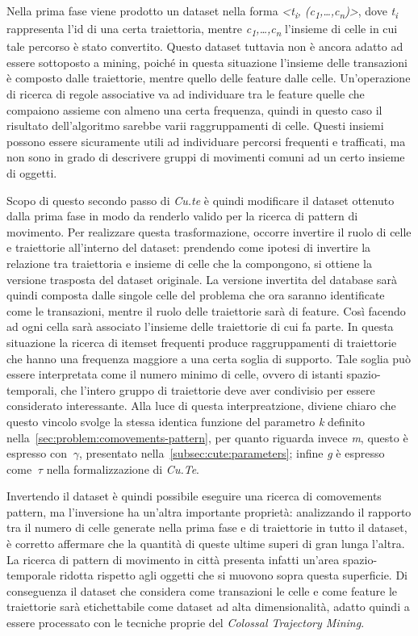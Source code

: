 Nella prima fase viene prodotto un dataset nella forma \textit{<t\textsubscript{i}, (c\textsubscript{1},\ldots,c\textsubscript{n})>},
dove \textit{t\textsubscript{i}} rappresenta l'id di una certa traiettoria, mentre \textit{c\textsubscript{1},\ldots,c\textsubscript{n}}
l'insieme di celle in cui tale percorso è stato convertito.
Questo dataset tuttavia non è ancora adatto ad essere sottoposto a mining, poiché in questa situazione l'insieme delle transazioni è composto dalle traiettorie,
mentre quello delle feature dalle celle.
Un'operazione di ricerca di regole associative va ad individuare tra le feature quelle che compaiono assieme con almeno una certa frequenza,
quindi in questo caso il risultato dell'algoritmo sarebbe varii raggruppamenti di celle.
Questi insiemi possono essere sicuramente utili ad individuare percorsi frequenti e trafficati, ma non sono in grado di descrivere gruppi di movimenti comuni ad un certo insieme di oggetti.

Scopo di questo secondo passo di \textit{Cu.te} è quindi modificare il dataset ottenuto dalla prima fase
in modo da renderlo valido per la ricerca di pattern di movimento.
Per realizzare questa trasformazione, occorre invertire il ruolo di celle e traiettorie all'interno del dataset: prendendo come
ipotesi di invertire la relazione tra traiettoria e insieme di celle che la compongono, si ottiene la versione trasposta del dataset originale.
La versione invertita del database sarà quindi composta dalle singole celle del problema che ora saranno identificate
come le transazioni, mentre il ruolo delle traiettorie sarà di feature. Così facendo ad ogni cella sarà associato l'insieme delle traiettorie di cui
fa parte.
In questa situazione la ricerca di itemset frequenti produce raggruppamenti di traiettorie che hanno una frequenza maggiore
a una certa soglia di supporto.
Tale soglia può essere interpretata come il numero minimo di celle, ovvero di istanti spazio-temporali, che
l'intero gruppo di traiettorie deve aver condivisio per essere considerato interessante.
Alla luce di questa interpreatzione, diviene chiaro che questo vincolo svolge la stessa identica funzione del parametro \textit{k} definito nella~\cref{sec:problem:comovements-pattern},
per quanto riguarda invece \textit{m}, questo è espresso con  \(~\gamma \), presentato nella~\cref{subsec:cute:parameters}; infine \textit{g} è espresso come \(~\tau \) nella formalizzazione di \textit{Cu.Te}.

Invertendo il dataset è quindi possibile eseguire una ricerca di comovements pattern, ma l'inversione ha un'altra importante proprietà:
analizzando il rapporto tra il numero di celle generate nella prima fase e di traiettorie in tutto il dataset, è corretto affermare che
la quantità di queste ultime superi di gran lunga l'altra. La ricerca di pattern di movimento in città presenta infatti un'area spazio-temporale
ridotta rispetto agli oggetti che si muovono sopra questa superficie.
Di conseguenza il dataset che considera come transazioni le celle e come feature le traiettorie sarà etichettabile come dataset ad alta dimensionalità, adatto quindi a essere processato con le tecniche proprie del
\textit{Colossal Trajectory Mining}.


